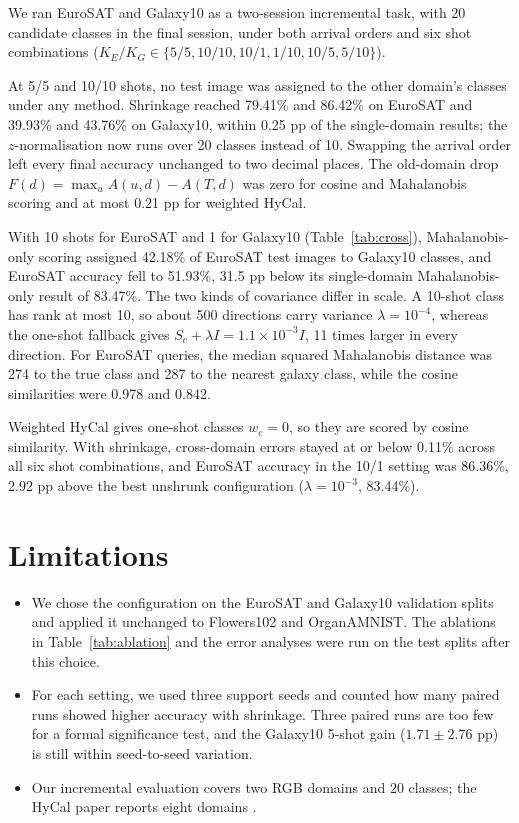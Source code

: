 \documentclass[letterpaper]{article} %
\begin{document}
We ran EuroSAT and Galaxy10 as a two-session incremental task, with 20 candidate classes in the final session, under both arrival orders and six shot combinations ($K_E / K_G \in \{5/5, 10/10, 10/1, 1/10, 10/5, 5/10\}$).

At 5/5 and 10/10 shots, no test image was assigned to the other domain's classes under any method. Shrinkage reached 79.41\% and 86.42\% on EuroSAT and 39.93\% and 43.76\% on Galaxy10, within 0.25 pp of the single-domain results; the $z$-normalisation now runs over 20 classes instead of 10. Swapping the arrival order left every final accuracy unchanged to two decimal places. The old-domain drop $F(d) = \max_u A(u, d) - A(T, d)$ was zero for cosine and Mahalanobis scoring and at most 0.21 pp for weighted HyCal.

With 10 shots for EuroSAT and 1 for Galaxy10 (Table~\ref{tab:cross}), Mahalanobis-only scoring assigned 42.18\% of EuroSAT test images to Galaxy10 classes, and EuroSAT accuracy fell to 51.93\%, 31.5 pp below its single-domain Mahalanobis-only result of 83.47\%. The two kinds of covariance differ in scale. A 10-shot class has rank at most 10, so about 500 directions carry variance $\lambda = 10^{-4}$, whereas the one-shot fallback gives $S_c + \lambda I = 1.1 \times 10^{-3} I$, 11 times larger in every direction. For EuroSAT queries, the median squared Mahalanobis distance was 274 to the true class and 287 to the nearest galaxy class, while the cosine similarities were 0.978 and 0.842.

Weighted HyCal gives one-shot classes $w_c = 0$, so they are scored by cosine similarity. With shrinkage, cross-domain errors stayed at or below 0.11\% across all six shot combinations, and EuroSAT accuracy in the 10/1 setting was 86.36\%, 2.92 pp above the best unshrunk configuration ($\lambda = 10^{-3}$, 83.44\%).

\section{Limitations}

\begin{itemize}
\item We chose the configuration on the EuroSAT and Galaxy10 validation splits and applied it unchanged to Flowers102 and OrganAMNIST. The ablations in Table~\ref{tab:ablation} and the error analyses were run on the test splits after this choice.
\item For each setting, we used three support seeds and counted how many paired runs showed higher accuracy with shrinkage. Three paired runs are too few for a formal significance test, and the Galaxy10 5-shot gain ($1.71 \pm 2.76$ pp) is still within seed-to-seed variation.
\item Our incremental evaluation covers two RGB domains and 20 classes; the HyCal paper reports eight domains \citep{lee2026hycal}.
\end{itemize}
\end{document}
